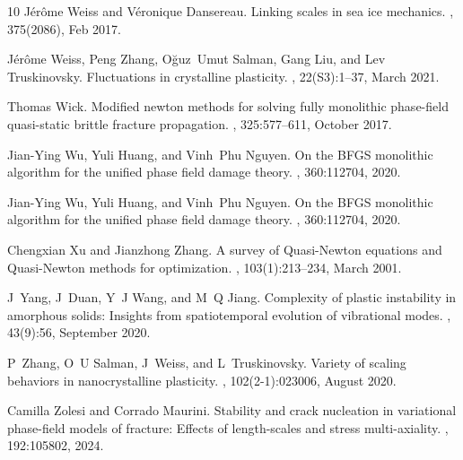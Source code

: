 \documentclass[10pt]{article}
\begin{document}
\begin{thebibliography}{10}
    J{\'e}r{\^o}me Weiss and V{\'e}ronique Dansereau.
    \newblock Linking scales in sea ice mechanics.
    , 375(2086), Feb 2017.

    J{\'e}r{\^o}me Weiss, Peng Zhang, O{\u g}uz~Umut Salman, Gang Liu, and Lev Truskinovsky.
    \newblock Fluctuations in crystalline plasticity.
    , 22(S3):1--37, March 2021.

    Thomas Wick.
    \newblock Modified newton methods for solving fully monolithic phase-field quasi-static brittle fracture propagation.
    , 325:577--611, October 2017.

    Jian-Ying Wu, Yuli Huang, and Vinh~Phu Nguyen.
    \newblock On the {BFGS} monolithic algorithm for the unified phase field damage theory.
    , 360:112704, 2020.

    Jian-Ying Wu, Yuli Huang, and Vinh~Phu Nguyen.
    \newblock On the {BFGS} monolithic algorithm for the unified phase field damage theory.
    , 360:112704, 2020.

    Chengxian Xu and Jianzhong Zhang.
    \newblock A survey of {Quasi-Newton} equations and {Quasi-Newton} methods for optimization.
    , 103(1):213--234, March 2001.

    J~Yang, J~Duan, Y~J Wang, and M~Q Jiang.
    \newblock Complexity of plastic instability in amorphous solids: Insights from spatiotemporal evolution of vibrational modes.
    , 43(9):56, September 2020.

    P~Zhang, O~U Salman, J~Weiss, and L~Truskinovsky.
    \newblock Variety of scaling behaviors in nanocrystalline plasticity.
    , 102(2-1):023006, August 2020.

    Camilla Zolesi and Corrado Maurini.
    \newblock Stability and crack nucleation in variational phase-field models of fracture: Effects of length-scales and stress multi-axiality.
    , 192:105802, 2024.

\end{thebibliography}
%
%
\end{document}
